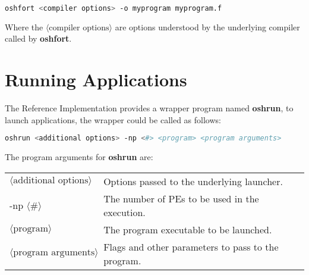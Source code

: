 \begin{lstlisting}[language=bash]
oshfort <compiler options> -o myprogram myprogram.f
\end{lstlisting}
Where the $\langle\mbox{compiler options}\rangle$ are options understood by the underlying \Fortran{} compiler called by \textbf{oshfort}.

\section{Running Applications}

The  \openshmem{} Reference Implementation provides a wrapper program named \textbf{oshrun}, to launch \openshmem applications, the wrapper could
be called as follows:

\begin{lstlisting}[language=bash]
oshrun <additional options> -np <#> <program> <program arguments>
\end{lstlisting}
The program arguments for \textbf{oshrun} are:

\begin{tabular}{p{}p{}}
$\langle\mbox{additional options}\rangle$ & {Options passed to the underlying launcher.}\tabularnewline
-np $\langle\mbox{\#}\rangle$ & {The number of \ac{PE}s to be used in the execution.}\tabularnewline
$\langle\mbox{program}\rangle$ & {The program executable to be launched.}\tabularnewline
$\langle\mbox{program arguments}\rangle$ & {Flags and other parameters to pass to the program.}\tabularnewline
\end{tabular}

